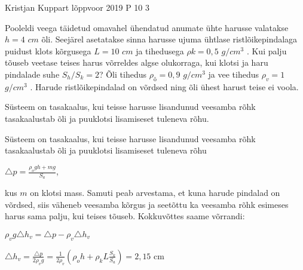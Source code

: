 {Kristjan Kuppart} %
{lõppvoor} %
{2019} %
{P 10} %
{3} %
{

\ifStatement
Pooleldi veega täidetud omavahel ühendatud anumate ühte harusse valatakse $h = 4$ $cm$ õli. Seejärel asetatakse sinna harusse ujuma ühtlase ristlõikepindalaga puidust klots kõrgusega $L = 10$ $cm$ ja tihedusega $\rho k = 0,5$ $g/cm^3$ . Kui palju tõuseb veetase teises harus võrreldes algse olukorraga, kui klotsi ja haru pindalade suhe $S_h / S_k = 2$? Õli tihedus $\rho_õ = 0,9$ $g/cm^3$ ja vee tihedus $\rho_v = 1$ $g/cm^3$ . Harude ristlõikepindalad on võrdsed ning õli ühest harust teise ei voola.
\fi

\ifHint
Süsteem on tasakaalus, kui teisse harusse lisandunud veesamba rõhk tasakaalustab õli ja puuklotsi lisamiseset tuleneva rõhu.
\fi

\ifSolution
Süsteem on tasakaalus, kui teisse harusse lisandunud veesamba rõhk tasakaalustab õli ja puuklotsi lisamiseset tuleneva rõhu
\begin{center}
$\triangle p = \frac{\rho_o gh + mg}{S_a}$,
\end{center}
kus $m$ on klotsi mass. Samuti peab arvestama, et kuna harude pindalad on võrdsed, siis väheneb veesamba kõrgus ja seetõttu ka veesamba rõhk esimeses harus sama palju, kui teises tõuseb. Kokkuvõttes saame võrrandi: 
\begin{center}
$\rho_v g \triangle h_v = \triangle p - \rho_v \triangle h_v$
\end{center}
\begin{center}
$\triangle h_v = \frac{\triangle p}{2 \rho _v g} = \frac{1}{2\rho_v}(\rho_o h + \rho_k L\frac{S_k}{S_a}) = 2,15$ cm
\end{center}
\fi
}